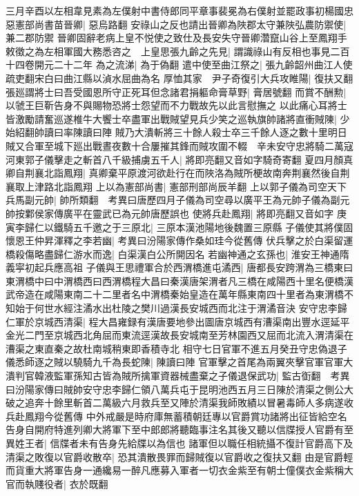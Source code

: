 三月辛酉以左相韋見素為左僕射中書侍郎同平章事裴冕為右僕射並罷政事初楊國忠惡憲部尚書苗晉卿|{
	惡烏路翻}
安祿山之反也請出晉卿為陜郡太守兼陜弘農防禦使|{
	兼二郡防禦}
晉卿固辭老病上皇不悦使之致仕及長安失守晉卿濳竄山谷上至鳳翔手敕徵之為左相軍國大務悉咨之　上皇思張九齡之先見|{
	謂識祿山有反相也事見二百十四卷開元二十二年}
為之流涕|{
	為于偽翻}
遣中使至曲江祭之|{
	張九齡韶州曲江人使疏吏翻宋白曰曲江縣以湞水屈曲為名}
厚恤其家　尹子奇復引大兵攻睢陽|{
	復扶又翻}
張廵謂將士曰吾受國恩所守正死耳但念諸君捐軀命膏草野|{
	膏居號翻}
而賞不酬勲|{
	以虢王巨靳告身不與賜物恐將士怨望而不力戰故先以此言慰撫之}
以此痛心耳將士皆激勵請奮巡遂椎牛大饗士卒盡軍出戰賊望見兵少笑之巡執旗帥諸將直衝賊陳|{
	少始紹翻帥讀曰率陳讀曰陣}
賊乃大潰斬將三十餘人殺士卒三千餘人逐之數十里明日賊又合軍至城下廵出戰晝夜數十合屢摧其鋒而賊攻圍不輟　辛未安守忠將騎二萬寇河東郭子儀擊走之斬首八千級捕虜五千人|{
	將即亮翻又音如字騎奇寄翻}
夏四月顏真卿自荆襄北詣鳳翔|{
	真卿棄平原渡河欲赴行在而陜洛為賊所梗故南奔荆襄然後自荆襄取上津路北詣鳳翔}
上以為憲部尚書|{
	憲部刑部尚辰羊翻}
上以郭子儀為司空天下兵馬副元帥|{
	帥所類翻　考異曰唐歷四月子儀為司空尋以廣平王為元帥子儀為副元帥按鄴侯家傳廣平在靈武已為元帥唐歷誤也}
使將兵赴鳳翔|{
	將即亮翻又音如字}
庚寅李歸仁以鐵騎五千邀之于三原北|{
	三原本漢池陽地後魏置三原縣}
子儀使其將僕固懷恩王仲昇渾釋之李若幽|{
	考異曰汾陽家傳作桑如珪今從舊傳}
伏兵擊之於白渠留運橋殺傷略盡歸仁游水而逸|{
	白渠漢白公所開因名}
若幽神通之玄孫也|{
	淮安王神通隋義寜初起兵應高祖}
子儀與王思禮軍合於西渭橋進屯潏西|{
	唐都長安跨渭為三橋東曰東渭橋中曰中渭橋西曰西渭橋程大昌曰秦漢唐架渭者凡三橋在咸陽西十里名便橋漢武帝造在咸陽東南二十二里者名中渭橋秦始皇造在萬年縣東南四十里者為東渭橋不知始于何世水經注潏水出杜陵之樊川過漢長安城西而北注于渭潏音決}
安守忠李歸仁軍於京城西清渠|{
	程大昌雍録有漢唐要地參出圖唐京城西有漕渠南出豐水逕延平金光二門至京城西北角屈而東流逕漢故長安城南至芳林園西又屈而北流入渭清渠在漕渠之東直秦之故杜南城稍東即香積寺北}
相守七日官軍不進五月癸丑守忠偽退子儀悉師逐之賊以驍騎九千為長蛇陳|{
	陳讀曰陣}
官軍擊之首尾為兩翼夾擊官軍官軍大潰判官韓液監軍孫知古皆為賊所擒軍資器械盡棄之子儀退保武功|{
	監古衘翻　考異曰汾陽家傳曰賊帥安守忠李歸仁領八萬兵屯于昆明池西五月三日陳於清渠之側公大破之追奔十餘里斬首二萬級六月救兵至又陣於清渠我師敗績以冒暑毒師人多病遂收兵赴鳳翔今從舊傳}
中外戒嚴是時府庫無蓄積朝廷專以官爵賞功諸將出征皆給空名告身自開府特進列卿大將軍下至中郎郎將聽臨事注名其後又聽以信牒授人官爵有至異姓王者|{
	信牒者未有告身先給牒以為信也}
諸軍但以職任相統攝不復計官爵高下及清渠之敗復以官爵收散卒|{
	恐其潰散畏罪而歸賊復以官爵收之復扶又翻}
由是官爵輕而貨重大將軍告身一通纔易一醉凡應募入軍者一切衣金紫至有朝士僮僕衣金紫稱大官而執賤役者|{
	衣於既翻}
